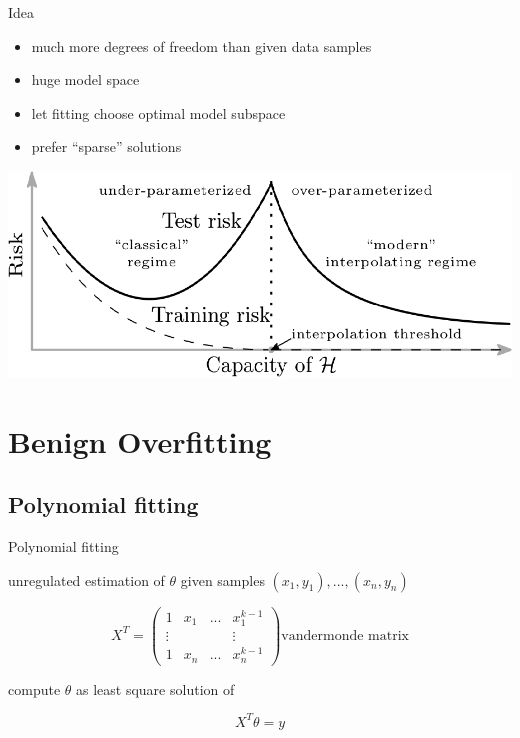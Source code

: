 \documentclass{beamer}
\begin{document}
\begin{frame}{Idea}
\begin{itemize}
	\item much more degrees of freedom than given data samples
	\item huge model space
	\item let fitting choose optimal model subspace
	\item prefer \enquote{sparse} solutions
\end{itemize}
\vspace{0.1cm}
\pause
\includegraphics[width=\textwidth]{source/BenignOverfittingModel.png}
\end{frame}

\section{Benign Overfitting}
\subsection{Polynomial fitting}
\begin{frame}{Polynomial fitting}
\begin{block}{unregulated  estimation of \(\theta\)}
given samples \((x_1, y_1), ..., (x_n, y_n)\)

		\begin{equation*}
			X^T = \begin{pmatrix}
			1 & x_1 & ... & x_1^{k-1}\\
			\vdots &&& \vdots\\
			1 & x_n & ... & x_n^{k-1}
			\end{pmatrix} \text{vandermonde matrix}
		\end{equation*}
		
compute \(\theta\) as least square solution of

\begin{equation}
X^T \theta = y
\end{equation}
\end{block}
\end{frame}
\end{document}
